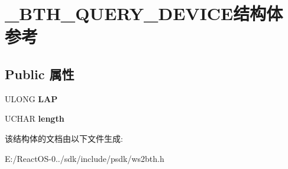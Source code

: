 \hypertarget{struct___b_t_h___q_u_e_r_y___d_e_v_i_c_e}{}\section{\+\_\+\+B\+T\+H\+\_\+\+Q\+U\+E\+R\+Y\+\_\+\+D\+E\+V\+I\+C\+E结构体 参考}
\label{struct___b_t_h___q_u_e_r_y___d_e_v_i_c_e}
\subsection*{Public 属性}
\begin{DoxyCompactItemize}
\item 
\mbox{\label{struct___b_t_h___q_u_e_r_y___d_e_v_i_c_e_ab90f5ec786ca50dd2b4e5c47d01ad443}} 
U\+L\+O\+NG {\bfseries L\+AP}
\item 
\mbox{\label{struct___b_t_h___q_u_e_r_y___d_e_v_i_c_e_a64cfca0071619ab77540da07e76eeae9}} 
U\+C\+H\+AR {\bfseries length}
\end{DoxyCompactItemize}


该结构体的文档由以下文件生成\+:\begin{DoxyCompactItemize}
\item 
E\+:/\+React\+O\+S-\/0../sdk/include/psdk/ws2bth.\+h\end{DoxyCompactItemize}

